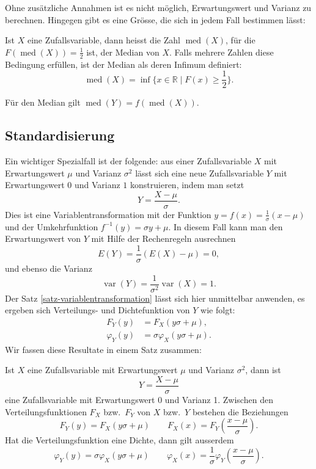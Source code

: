 Ohne zusätzliche Annahmen ist es nicht möglich, Erwartungswert und
Varianz zu berechnen.
Hingegen gibt es eine Grösse, die sich in jedem
Fall bestimmen lässt:
\begin{definition}
Ist $X$ eine Zufallsvariable, dann heisst die Zahl $\operatorname{med}(X)$,
für die
$F(\operatorname{med}(X))=\frac12$ ist, der Median von $X$. 
Falls mehrere Zahlen diese Bedingung erfüllen, ist der Median als
deren Infimum definiert:
\[
\operatorname{med}(X)=\inf \{x\in\mathbb{R}\;|\;F(x)\ge{\textstyle \frac12}\}.
\]
\end{definition}
Für den Median gilt $\operatorname{med}(Y)=f(\operatorname{med}(X))$.

\subsection{Standardisierung} \label{section-standardisierung}
Ein wichtiger Spezialfall ist der folgende:
aus einer Zufallsvariable $X$ mit Erwartungswert
$\mu$ und Varianz $\sigma^2$ lässt sich eine neue Zufallsvariable $Y$ mit
Erwartungswert $0$ und Varianz $1$ konstruieren, indem man setzt
\[
Y=\frac{X-\mu}{\sigma}.
\]
Dies ist eine Variablentransformation mit der Funktion
$y=f(x)=\frac1\sigma(x-\mu)$ und der Umkehrfunktion $f^{-1}(y)=\sigma y+\mu$.
In diesem Fall kann man den Erwartungswert von $Y$ mit Hilfe der Rechenregeln
ausrechnen
\[
E(Y)=\frac1{\sigma}(E(X)-\mu)=0,
\]
und ebenso die Varianz
\[
\operatorname{var}(Y)=\frac1{\sigma^2}\operatorname{var}(X)=1.
\]
Der Satz \ref{satz-variablentransformation} lässt sich hier unmittelbar
anwenden, es ergeben sich Verteilungs- und Dichtefunktion von $Y$
wie folgt:
\begin{align*}
F_Y(y)&=F_X(y\sigma+\mu),\\
\varphi_Y(y)&=\sigma\varphi_X(y\sigma+\mu).
\end{align*}
Wir fassen diese Resultate in einem Satz zusammen:

\begin{satz}
\label{satz-standardisierung}
Ist $X$ eine Zufallsvariable mit Erwartungswert $\mu$ und
Varianz $\sigma^2$, dann ist
\[
Y=\frac{X-\mu}\sigma
\]
eine Zufallsvariable mit Erwartungswert 0 und Varianz 1.
Zwischen den Verteilungsfunktionen $F_X$ bzw.~$F_Y$ von $X$ bzw.~$Y$ 
bestehen die Beziehungen
\[
F_Y(y)=F_X(y\sigma+\mu)\qquad F_X(x)=F_Y\left(\frac{x-\mu}\sigma\right).
\]
Hat die Verteilungsfunktion eine Dichte, dann gilt ausserdem
\[
\varphi_Y(y)=\sigma\varphi_X(y\sigma+\mu)\qquad
\varphi_X(x)=\frac1{\sigma}\varphi_Y\left(\frac{x-\mu}\sigma\right).
\]
\end{satz}


